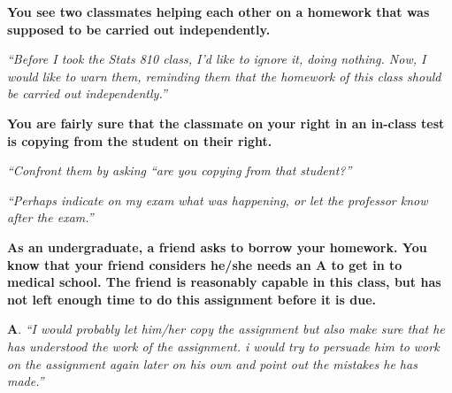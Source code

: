 \documentclass[portrait,11pt]{seminar}
\begin{document}
\bs 

{\bf
You see two classmates helping each other on a homework that was supposed to be carried out independently.
}

{ \it ``Before I took the Stats 810 class, I'd like to ignore it, doing nothing. Now, I would like to warn them, reminding them that the homework of this class should be carried out independently.''}






\es
\bs

{\bf 
You are fairly sure that the classmate on your right in an in-class test is copying from the student on their right.
}

{ \it ``Confront them by asking “are you copying from that student?''}

{\it ``Perhaps indicate on my exam what was happening, or let the professor know after the exam.''}





\es

\bs

{\bf
As an undergraduate, a friend asks to borrow your homework. You know that your friend considers he/she needs an A to get in to medical school. The friend is reasonably capable in this class, but has not left enough time to do this assignment before it is due.
}

{\bf A}. {\it ``I would probably let him/her copy the assignment but also make sure that he has understood the work of the assignment. i would try to persuade him to work on the assignment again later on his own and point out the mistakes he has made.''}

\medskip 
\end{document}
